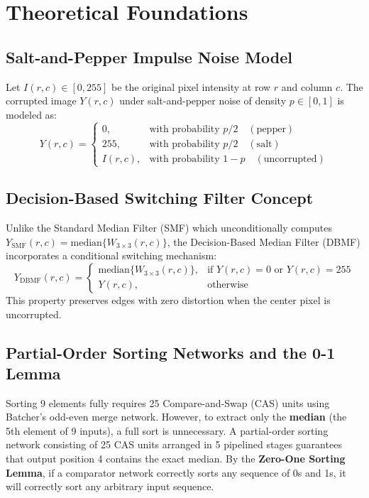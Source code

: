 \documentclass[12pt,a4paper]{article}
\begin{document}
\section{Theoretical Foundations}

\subsection{Salt-and-Pepper Impulse Noise Model}
Let $I(r,c) \in [0, 255]$ be the original pixel intensity at row $r$ and column $c$. The corrupted image $Y(r,c)$ under salt-and-pepper noise of density $p \in [0, 1]$ is modeled as:
\begin{equation}
Y(r,c) = \begin{cases}
0, & \text{with probability } p/2 \quad (\text{pepper}) \\
255, & \text{with probability } p/2 \quad (\text{salt}) \\
I(r,c), & \text{with probability } 1-p \quad (\text{uncorrupted})
\end{cases}
\end{equation}

\subsection{Decision-Based Switching Filter Concept}
Unlike the Standard Median Filter (SMF) which unconditionally computes $Y_{\text{SMF}}(r,c) = \text{median}\{W_{3\times 3}(r,c)\}$, the Decision-Based Median Filter (DBMF) incorporates a conditional switching mechanism:
\begin{equation}
Y_{\text{DBMF}}(r,c) = \begin{cases}
\text{median}\{W_{3\times 3}(r,c)\}, & \text{if } Y(r,c) = 0 \text{ or } Y(r,c) = 255 \\
Y(r,c), & \text{otherwise}
\end{cases}
\end{equation}
This property preserves edges with zero distortion when the center pixel is uncorrupted.

\subsection{Partial-Order Sorting Networks and the 0-1 Lemma}
Sorting 9 elements fully requires 25 Compare-and-Swap (CAS) units using Batcher's odd-even merge network. However, to extract only the \textbf{median} (the 5th element of 9 inputs), a full sort is unnecessary. A partial-order sorting network consisting of 25 CAS units arranged in 5 pipelined stages guarantees that output position 4 contains the exact median. By the \textbf{Zero-One Sorting Lemma}, if a comparator network correctly sorts any sequence of 0s and 1s, it will correctly sort any arbitrary input sequence.
\end{document}
